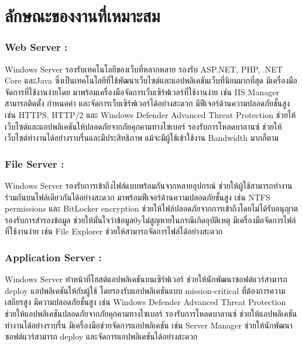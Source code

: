 \section{ลักษณะของงานที่เหมาะสม}

\hspace{0cm}\subsubsection{Web Server :}Windows Server รองรับเทคโนโลยีของเว็บที่หลากหลาย รองรับ ASP.NET, PHP, .NET Core และJava ซึ่งเป็นเทคโนโลยีที่ใช้พัฒนาเว็บไซต์และแอปพลิเคชันเว็บที่นิยมมากที่สุด  
มีเครื่องมือจัดการที่ใช้งานง่ายโดย มาพร้อมเครื่องมือจัดการเว็บเซิร์ฟเวอร์ที่ใช้งานง่าย เช่น IIS Manager สามารถติดตั้ง กำหนดค่า และจัดการเว็บเซิร์ฟเวอร์ได้อย่างสะดวก 
มีฟีเจอร์ด้านความปลอดภัยชั้นสูง เช่น HTTPS, HTTP/2 และ Windows Defender Advanced Threat Protection ช่วยให้เว็บไซต์และแอปพลิเคชันให้ปลอดภัยจากภัยคุกคามทางไซเบอร์ 
รองรับการโหลดบาลานซ์ ช่วยให้เว็บไซต์ทำงานได้อย่างราบรื่นและมีประสิทธิภาพ แม้จะมีผู้ใช้เข้าใช้งาน Bandwidth มากก็ตาม 

\hspace{0cm}\subsubsection{File Server :}Windows Server รองรับการเข้าถึงไฟล์แบบพร้อมกันจากหลายอุปกรณ์ ช่วยให้ผู้ใช้สามารถทำงานร่วมกันบนไฟล์เดียวกันได้อย่างสะดวก 
มาพร้อมฟีเจอร์ด้านความปลอดภัยชั้นสูง เช่น NTFS permissions และ BitLocker encryption ช่วยให้ไฟล์ปลอดภัยจากการเข้าถึงโดยไม่ได้รับอนุญาต 
รองรับการสำรองข้อมูล ช่วยให้มั่นใจว่าข้อมูล0yไม่สูญหายในกรณีเกิดอุบัติเหตุ 
มีเครื่องมือจัดการไฟล์ที่ใช้งานง่าย เช่น File Explorer ช่วยให้สามารถจัดการไฟล์ได้อย่างสะดวก 

\hspace{0cm}\subsubsection{Application Server :}Windows Server ทำหน้าที่โฮสต์แอปพลิเคชันบนเซิร์ฟเวอร์ ช่วยให้นักพัฒนาซอฟต์แวร์สามารถ deploy แอปพลิเคชันให้กับผู้ใช้ 
โดยรองรับแอปพลิเคชันแบบ mission-critical ที่ต้องการความเสถียรสูง 
มีความปลอดภัยชั้นสูง เช่น Windows Defender Advanced Threat Protection ช่วยให้แอปพลิเคชันปลอดภัยจากภัยคุกคามทางไซเบอร์ 
รองรับการโหลดบาลานซ์ ช่วยให้แอปพลิเคชันทำงานได้อย่างราบรื่น
มีเครื่องมือช่วยจัดการแอปพลิเคชัน เช่น Server Manager ช่วยให้นักพัฒนาซอฟต์แวร์สามารถ deploy และจัดการแอปพลิเคชันได้อย่างสะดวก

